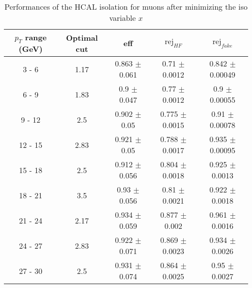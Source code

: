 \begin{table}[htbp]
   \centering
   \begin{tabular}{|c|c|c|c|c|}
      \hline
      $p_T$ range (GeV) & Optimal cut & eff & $\textrm{rej}_{HF}$ & $\textrm{rej}_{fake}$ \\
      \hline
      3 - 6 & 1.17 & 0.863 $\pm$ 0.061 & 0.71 $\pm$ 0.0012 & 0.842 $\pm$ 0.00049 \\
      \hline
      6 - 9 & 1.83 & 0.9 $\pm$ 0.047 & 0.77 $\pm$ 0.0012 & 0.9 $\pm$ 0.00055 \\
      \hline
      9 - 12 & 2.5 & 0.902 $\pm$ 0.05 & 0.775 $\pm$ 0.0015 & 0.91 $\pm$ 0.00078 \\
      \hline
      12 - 15 & 2.83 & 0.921 $\pm$ 0.05 & 0.788 $\pm$ 0.0017 & 0.935 $\pm$ 0.00095 \\
      \hline
      15 - 18 & 2.5 & 0.912 $\pm$ 0.056 & 0.804 $\pm$ 0.0018 & 0.925 $\pm$ 0.0013 \\
      \hline
      18 - 21 & 3.5 & 0.93 $\pm$ 0.056 & 0.81 $\pm$ 0.0021 & 0.922 $\pm$ 0.0018 \\
      \hline
      21 - 24 & 2.17 & 0.934 $\pm$ 0.059 & 0.877 $\pm$ 0.002 & 0.961 $\pm$ 0.0016 \\
      \hline
      24 - 27 & 2.83 & 0.922 $\pm$ 0.071 & 0.869 $\pm$ 0.0023 & 0.934 $\pm$ 0.0026 \\
      \hline
      27 - 30 & 2.5 & 0.931 $\pm$ 0.074 & 0.864 $\pm$ 0.0025 & 0.95 $\pm$ 0.0027 \\
      \hline
   \end{tabular}
   \caption{\small{Performances of the HCAL isolation for muons after minimizing the iso variable $x$}\label{tab:hcal_muon_opt}}
\end{table}






